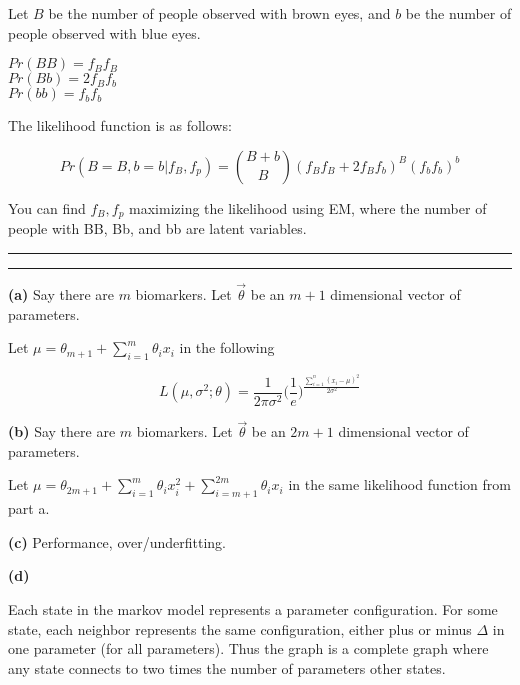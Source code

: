 \documentclass[11pt,letterpaper]{article}
\newcommand{\question}[1] {\vspace{.25in} \hrule\vspace{0.5em}
\noindent{\bf #1} \vspace{0.5em}
\hrule \vspace{.10in}}
\renewcommand{\part}[1] {\vspace{.10in} {\bf (#1)}}
\begin{document}
Let $B$ be the number of people observed with brown eyes,
and $b$ be the number of people observed with blue eyes.

$Pr(BB) = f_Bf_B$\\
$Pr(Bb) = 2f_Bf_b$\\
$Pr(bb) = f_bf_b$

The likelihood function is as follows:

$$Pr(B=B, b=b | f_B, f_p) = \binom{B+b}{B}(f_Bf_B + 2f_Bf_b)^B(f_bf_b)^b$$

You can find $f_B, f_p$ maximizing the likelihood using EM,
where the number of people with BB, Bb, and bb are latent variables.

\question{2}

\part{a}
Say there are $m$ biomarkers. Let $\vec{\theta}$ be an $m+1$ dimensional vector of parameters.

Let $\mu =  \theta_{m+1} + \sum_{i=1}^{m} \theta_i x_i $ in the following

$$L(\mu, \sigma^2; \theta) = \frac{1}{2\pi\sigma^2} \bigg(\frac{1}{e}\bigg)^\frac{\sum_{i=1}^{n} (x_i-\mu)^2}{2\sigma^2}$$

\part{b}
Say there are $m$ biomarkers. Let $\vec{\theta}$ be an $2m+1$ dimensional vector of parameters.

Let $\mu =  \theta_{2m+1} + \sum_{i=1}^{m} \theta_i x_i^2 + \sum_{i=m+1}^{2m} \theta_i x_i $ in the same likelihood function from part a.

\part{c}
Performance, over/underfitting.

\part{d}

Each state in the markov model represents a parameter configuration.
For some state, each neighbor represents
the same configuration, either plus or minus $\Delta$ in one parameter (for all parameters).
Thus the graph is a complete graph where any state connects to two times
the number of parameters other states.
\end{document}
